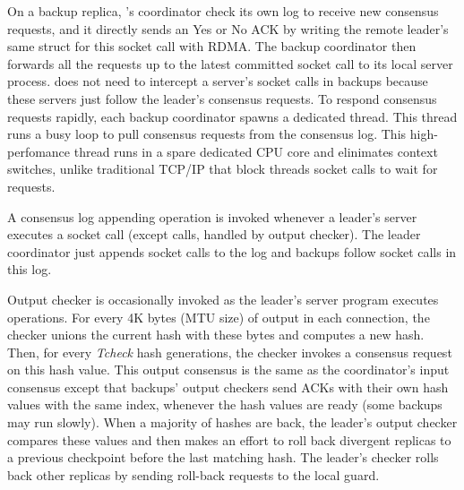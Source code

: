 
On a backup replica, \xxx's coordinator check its own log to receive new 
consensus requests, and it directly sends an Yes or No ACK by writing the 
remote leader's same struct for this socket call with RDMA. The backup 
coordinator then forwards all the requests up to the latest committed socket 
call to its local server process. \xxx does not need to intercept a 
server's socket calls in backups because these servers just follow the 
leader's consensus requests. To respond consensus requests rapidly, each 
backup coordinator spawns a dedicated thread. This thread runs a busy loop to 
pull consensus requests from the consensus log. This high-perfomance thread 
runs in a spare dedicated CPU core and elinimates context switches, unlike 
traditional TCP/IP that block threads socket calls to wait for requests.

A consensus log appending operation is invoked whenever a leader's server 
executes a socket call (except \send calls, handled by output checker). The 
leader coordinator just appends socket calls to the log and backups follow 
socket calls in this log.

Output checker is occasionally invoked as the leader's server program executes 
\send operations. For every 4K bytes (MTU size) of output in each connection, 
the checker unions the current hash with these bytes and computes a new hash. 
Then, for every \emph{Tcheck} hash generations, the checker invokes a consensus 
request on this hash value. This output consensus is the same as the 
coordinator's input consensus except that backups' output checkers send ACKs 
with their own hash values with the same index, whenever the hash values are 
ready (some backups may run slowly). When a majority of hashes are back, the 
leader's output checker compares these values and then makes an effort to roll 
back divergent replicas to a previous checkpoint before the last matching hash. 
The leader's checker rolls back other replicas by sending roll-back requests to 
the local guard.

